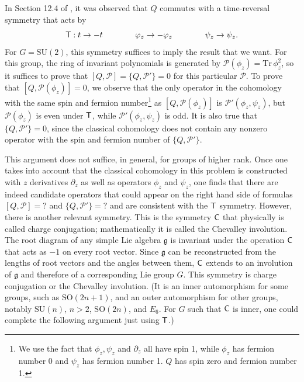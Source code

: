 \documentclass[11pt,a4paper]{article}
\begin{document}
In Section 12.4 of \cite{KW}, it was observed that $Q$ commutes with a time-reversal symmetry that acts by
\begin{equation}\label{tadd}
{\sf T}: t \to - t \qquad \qquad \varphi_z \to - \varphi_z \qquad \qquad \psi_z \to \psi_z.
\end{equation}
For $G=\mathrm{SU}(2)$, this symmetry suffices to imply the result that we want.   For this group, the ring of invariant polynomials is generated by $\mathcal P(\phi_z)={\mathrm{Tr}}\,
\phi_z^2$, so it suffices to prove that $[Q,\mathcal P]=\{Q,\mathcal P'\}=0$ for this particular $\mathcal P$.    To prove that $[Q,\mathcal P(\phi_z)]=0$, we observe that the only operator
in the cohomology with the same spin and fermion number\footnote{We use the fact that $\phi_z,\psi_z$ and $\partial_z$ all have spin 1, while
$\phi_z$ has fermion number 0 and $\psi_z$ has fermion number 1. $Q$ has spin zero and fermion number 1.} as  $[Q,\mathcal P(\phi_z)]$ is $\mathcal P'(\phi_z,\psi_z)$, 
but $\mathcal P(\phi_z)$ is even under $\sf T$, while  ${\mathcal P}'(\phi_z,\psi
_z)$ is odd.
  It is also true that $\{Q,\mathcal P'\}=0$, since the classical
cohomology does not contain any nonzero operator with the spin and fermion number of $\{Q,\mathcal P'\}$.

This argument does not suffice, in general, for groups of higher rank.   Once one takes into account that the classical cohomology in this problem is constructed
with $z$ derivatives $\partial_z$ as well as operators $\phi_z$ and $\psi_z$, one finds that there are indeed candidate operators that could appear on the right hand
side of formulas $[Q,\mathcal P]=?$ and $\{Q,\mathcal P'\}=?$ and are consistent with the $\sf T$ symmetry.    However, there is another relevant symmetry.  This is the symmetry $\sf C$
 that physically is called charge conjugation; mathematically it is called the Chevalley involution.   The root diagram of any simple Lie algebra $\mathfrak g$ is invariant under
 the operation $\sf C$ that acts as $-1$ on every root vector. Since $\mathfrak g$ 
 can be reconstructed from the lengths of root vectors and the angles between them,
 $\sf C$ extends to an involution of $\mathfrak g$ and therefore of a corresponding Lie group $G$.   This symmetry is charge conjugation or the Chevalley involution.
 (It is an inner automorphism for some groups, such as ${\mathrm{SO}}(2n+1)$, and an outer automorphism for other groups, notably ${\mathrm{SU}}(n),\,n>2$, 
 ${\mathrm{SO}}(2n)$, and $E_6$. For $G$ such that $\sf C$ is inner, one could complete the following argument just using $\sf T$.)    
 
\end{document}
